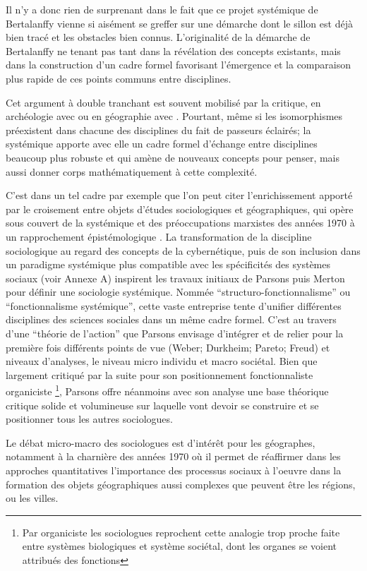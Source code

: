 Il n'y a donc rien de surprenant dans le fait que ce projet systémique de Bertalanffy vienne si aisément se greffer sur une démarche dont le sillon est déjà bien tracé et les obstacles bien connus. L'originalité de la démarche de Bertalanffy ne tenant pas tant dans la révélation des concepts existants, mais dans la construction d'un cadre formel favorisant l'émergence et la comparaison plus rapide de ces points communs entre disciplines.

Cet argument à double tranchant est souvent mobilisé par la critique, en archéologie avec \textcite{Salmon1978} ou en géographie avec \textcite{Chisholm1967}. Pourtant, même si les isomorphismes préexistent dans chacune des disciplines du fait de passeurs éclairés; la systémique apporte avec elle un cadre formel d'échange entre disciplines beaucoup plus robuste et qui amène de nouveaux concepts pour penser, mais aussi donner corps mathématiquement à cette complexité.

C'est dans un tel cadre par exemple que l'on peut citer l'enrichissement apporté par le croisement entre objets d'études sociologiques et géographiques, qui opère sous couvert de la systémique et des préoccupations marxistes des années 1970 à un rapprochement épistémologique \autocite{Claval1995}. La transformation de la discipline sociologique au regard des concepts de la cybernétique, puis de son inclusion dans un paradigme systémique plus compatible avec les spécificités des systèmes sociaux (voir Annexe A) inspirent les travaux initiaux de Parsons puis Merton pour définir une sociologie systémique. Nommée \enquote{structuro-fonctionnalisme} ou \enquote{fonctionnalisme systémique}, cette vaste entreprise tente d'unifier différentes disciplines des sciences sociales dans un même cadre formel. C'est au travers d'une \enquote{théorie de l'action} que Parsons envisage d'intégrer et de relier pour la première fois différents points de vue (Weber; Durkheim; Pareto; Freud) et niveaux d'analyses, le niveau micro individu et macro sociétal. Bien que largement critiqué par la suite pour son positionnement fonctionnaliste organiciste \footnote{Par organiciste les sociologues reprochent cette analogie trop proche faite entre systèmes biologiques et système sociétal, dont les organes se voient attribués des fonctions}, Parsons offre néanmoins avec son analyse une base théorique critique solide et volumineuse sur laquelle vont devoir se construire et se positionner tous les autres sociologues.

Le débat micro-macro des sociologues est d'intérêt pour les géographes, notamment à la charnière des années 1970 où il permet de réaffirmer dans les approches quantitatives l'importance des processus sociaux à l'oeuvre dans la formation des objets géographiques aussi complexes que peuvent être les régions, ou les villes.


